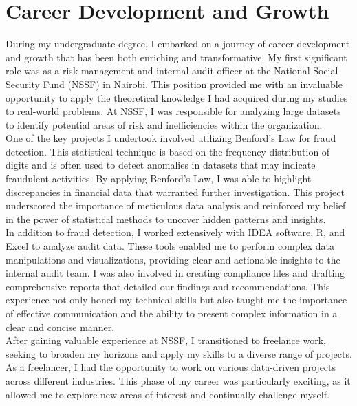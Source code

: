 \documentclass[12pt,a4paper,sans,english]{report}
\begin{document}
	\chapter{Career Development and Growth}
	
During my undergraduate degree, I embarked on a journey of career development and growth that has been both enriching and transformative. My first significant role was as a risk management and internal audit officer at the National Social Security Fund (NSSF) in Nairobi. This position provided me with an invaluable opportunity to apply the theoretical knowledge I had acquired during my studies to real-world problems. At NSSF, I was responsible for analyzing large datasets to identify potential areas of risk and inefficiencies within the organization.\\

\noindent One of the key projects I undertook involved utilizing Benford's Law for fraud detection. This statistical technique is based on the frequency distribution of digits and is often used to detect anomalies in datasets that may indicate fraudulent activities. By applying Benford's Law, I was able to highlight discrepancies in financial data that warranted further investigation. This project underscored the importance of meticulous data analysis and reinforced my belief in the power of statistical methods to uncover hidden patterns and insights.\\

\noindent In addition to fraud detection, I worked extensively with IDEA software, R, and Excel to analyze audit data. These tools enabled me to perform complex data manipulations and visualizations, providing clear and actionable insights to the internal audit team. I was also involved in creating compliance files and drafting comprehensive reports that detailed our findings and recommendations. This experience not only honed my technical skills but also taught me the importance of effective communication and the ability to present complex information in a clear and concise manner.\\

\noindent After gaining valuable experience at NSSF, I transitioned to freelance work, seeking to broaden my horizons and apply my skills to a diverse range of projects. As a freelancer, I had the opportunity to work on various data-driven projects across different industries. This phase of my career was particularly exciting, as it allowed me to explore new areas of interest and continually challenge myself.\\
\end{document}
